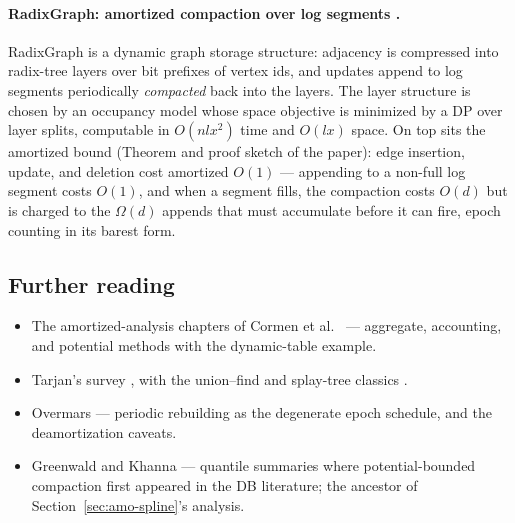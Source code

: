 \paragraph{RadixGraph: amortized compaction over log segments
\citep{sigmod26-203}.}
RadixGraph is a dynamic graph storage structure: adjacency is compressed
into radix-tree layers over bit prefixes of vertex ids, and updates append
to log segments periodically \emph{compacted} back into the layers. The
layer structure is chosen by an occupancy model whose space objective is
minimized by a DP over layer splits, computable in $O(nlx^{2})$ time and
$O(lx)$ space. On top sits the amortized bound (Theorem and proof sketch
of the paper): edge insertion, update, and deletion cost amortized $O(1)$
--- appending to a non-full log segment costs $O(1)$, and when a segment
fills, the compaction costs $O(d)$ but is charged to the $\Omega(d)$
appends that must accumulate before it can fire, epoch counting in its
barest form.

\subsection{Further reading}

\begin{itemize}
\item The amortized-analysis chapters of Cormen et al.\
\citep{amortized-potential-bg3} --- aggregate, accounting, and potential
methods with the dynamic-table example.
\item Tarjan's survey \citep{amortized-potential-bg1}, with the union--find
and splay-tree classics \citep{amortized-potential-bg2}.
\item Overmars \citep{amortized-potential-bg5} --- periodic rebuilding as
the degenerate epoch schedule, and the deamortization caveats.
\item Greenwald and Khanna \citep{amortized-potential-bg4} --- quantile
summaries where potential-bounded compaction first appeared in the DB
literature; the ancestor of Section~\ref{sec:amo-spline}'s analysis.
\end{itemize}

